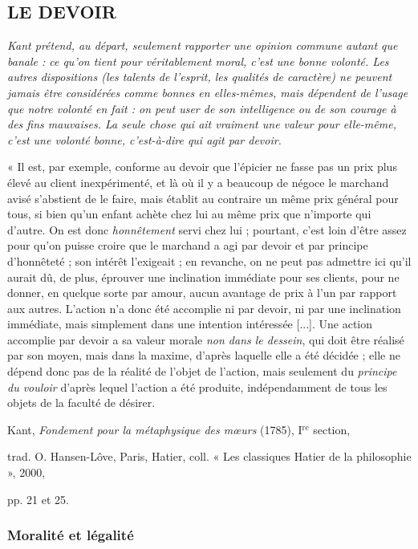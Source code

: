 
\subsection{LE DEVOIR}

{\it Kant prétend, au départ, seulement rapporter une opinion commune autant que
banale : ce qu'on tient pour véritablement moral, c'est une bonne volonté. Les
autres dispositions (les talents de l'esprit, les qualités de caractère) ne peuvent
jamais être considérées comme bonnes en elles-mêmes, mais dépendent de l'usage
que notre volonté en fait : on peut user de son intelligence ou de son courage à des
fins mauvaises. La seule chose qui ait vraiment une valeur pour elle-même, c'est
une volonté bonne, c'est-à-dire qui agit par devoir.}

« Il est, par exemple, conforme au devoir que l’épicier ne fasse pas un prix plus
élevé au client inexpérimenté, et là où il y a beaucoup de négoce le marchand avisé
s'abstient de le faire, mais établit au contraire un même prix général pour tous, si
bien qu’un enfant achète chez lui au même prix que n'importe qui d'autre. On est
donc {\it honnêtement} servi chez lui ; pourtant, c’est loin d’être assez pour qu’on
puisse croire que le marchand a agi par devoir et par principe d’honnêteté ; son
intérêt l’exigeait ; en revanche, on ne peut pas admettre ici qu’il aurait dû, de plus,
éprouver une inclination immédiate pour ses clients, pour ne donner, en quelque
sorte par amour, aucun avantage de prix à l’un par rapport aux autres. L'action n’a
donc été accomplie ni par devoir, ni par une inclination immédiate, mais simplement
dans une intention intéressée [...]. Une action accomplie par devoir a sa
valeur morale {\it non dans le dessein}, qui doit être réalisé par son moyen, mais dans la
maxime, d’après laquelle elle a été décidée ; elle ne dépend donc pas de la réalité
de l’objet de l’action, mais seulement du {\it principe du vouloir} d'après lequel l’action
a été produite, indépendamment de tous les objets de la faculté de désirer.

\begin{flushright}
Kant, {\it Fondement pour la métaphysique des mœurs} (1785), I$^\text{re}$ section,

trad. O. Hansen-Lôve, Paris, Hatier, coll. « Les classiques Hatier de la philosophie », 2000,

pp. 21 et 25.
\end{flushright}

\subsubsection{Moralité et légalité}

